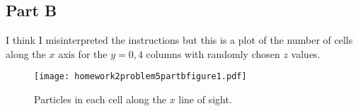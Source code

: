 \subsection*{Part B}

I think I misinterpreted the instructions but this is a plot of the number of cells along the $x$ axis for the $y=0, 4$ columns with randomly chosen $z$ values.



\clearpage

\begin{figure}[h]
    \centering
    \texttt{[image: homework2problem5partbfigure1.pdf]}
    \caption{Particles in each cell along the $x$ line of sight.}
    \label{fig:25b1}
\end{figure}

\clearpage
